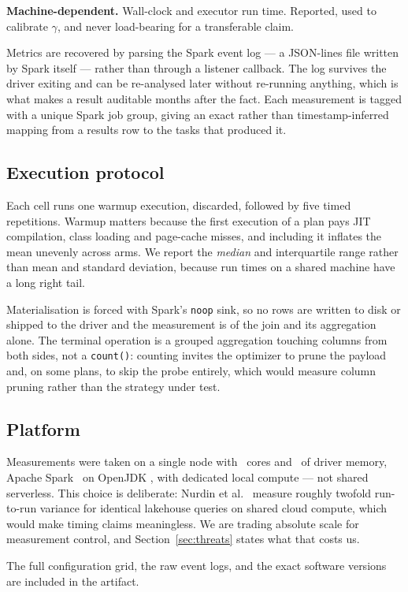 \textbf{Machine-dependent.} Wall-clock and executor run time. Reported, used to
calibrate $\gamma$, and never load-bearing for a transferable claim.

Metrics are recovered by parsing the Spark event log --- a JSON-lines file
written by Spark itself --- rather than through a listener callback. The log
survives the driver exiting and can be re-analysed later without re-running
anything, which is what makes a result auditable months after the fact. Each
measurement is tagged with a unique Spark job group, giving an exact rather
than timestamp-inferred mapping from a results row to the tasks that produced
it.

\subsection{Execution protocol}

Each cell runs one warmup execution, discarded, followed by five timed
repetitions. Warmup matters because the first execution of a plan pays JIT
compilation, class loading and page-cache misses, and including it inflates the
mean unevenly across arms. We report the \emph{median} and interquartile range
rather than mean and standard deviation, because run times on a shared machine
have a long right tail.

Materialisation is forced with Spark's \texttt{noop} sink, so no rows are
written to disk or shipped to the driver and the measurement is of the join and
its aggregation alone. The terminal operation is a grouped aggregation touching
columns from both sides, not a \texttt{count()}: counting invites the optimizer
to prune the payload and, on some plans, to skip the probe entirely, which
would measure column pruning rather than the strategy under test.

\subsection{Platform}

Measurements were taken on a single node with \CORES\ cores and \DRIVERMEM\ of
driver memory, Apache Spark \SPARKVER\ on OpenJDK \JAVAVER, with dedicated
local compute --- not shared serverless. This choice is deliberate: Nurdin et
al.~\cite{nurdin2026lakehouseperf} measure roughly twofold run-to-run variance
for identical lakehouse queries on shared cloud compute, which would make
timing claims meaningless. We are trading absolute scale for measurement
control, and Section~\ref{sec:threats} states what that costs us.

The full configuration grid, the raw event logs, and the exact software
versions are included in the artifact.
